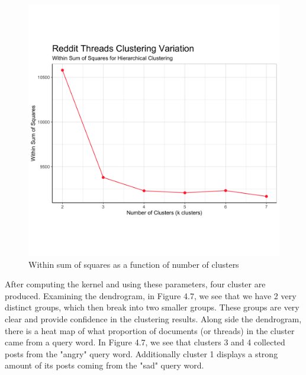\begin{figure}
\includegraphics[width=6in]{Content/Images/reddit_wss.png}
\caption{Within sum of squares as a function of number of clusters}
\end{figure}

After computing the kernel and using these parameters, four cluster are produced. Examining the dendrogram, in Figure 4.7, we see that we have 2 very distinct groups, which then break into two smaller groups. These groups are very clear and provide confidence in the clustering results. Along side the dendrogram, there is a heat map of what proportion of documents (or threads) in the cluster came from a query word. In Figure 4.7, we see that clusters 3 and 4 collected posts from the "angry" query word. Additionally cluster 1 displays a 
strong amount of its posts coming from the "sad" query word. \\

